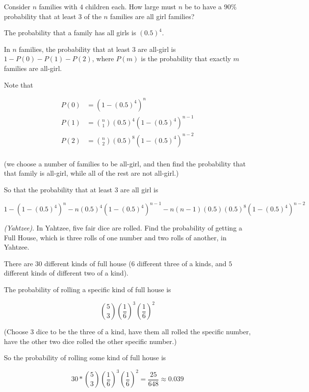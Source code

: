 \begin{problem}[Handout 5, \# 8]
  Consider \(n\) families with \(4\) children each. How large must \(n\) be
  to have a \(90\%\) probability that at least \(3\) of the \(n\) families
  are all girl families?
\end{problem}
\begin{solution}
The probability that a family has all girls is $(0.5)^4$.

In $n$ families, the probability that at least $3$ are all-girl is $1-P(0)-P(1)-P(2)$, where $P(m)$ is the probability that exactly $m$ families are all-girl. 

Note that

\begin{align*}
P(0) &= (1-(0.5)^4)^n \\
P(1) &= \binom{n}{1}(0.5)^4(1-(0.5)^4)^{n-1} \\
P(2) &= \binom{n}{2}(0.5)^8(1-(0.5)^4)^{n-2} \\
\end{align*}

(we choose a number of families to be all-girl, and then find the probability that that family is all-girl, while all of the rest are not all-girl.)

So that the probability that at least $3$ are all girl is

\[
1-(1-(0.5)^4)^n - n(0.5)^4(1-(0.5)^4)^{n-1} - n(n-1)(0.5)(0.5)^8(1-(0.5)^4)^{n-2}
\]


\end{solution}
\newpage

\begin{problem}[Handout 5, \# 10]
  \emph{(Yahtzee).} In Yahtzee, five fair dice are rolled. Find the
  probability of getting a Full House, which is three rolls of one number
  and two rolls of another, in Yahtzee.
\end{problem}
\begin{solution}
There are $30$ different kinds of full house ($6$ different three of a kinds, and $5$ different kinds of different two of a kind).

The probability of rolling a specific kind of full house is 

\[
\binom{5}{3} \left( \frac{1}{6}\right)^3 \left(\frac{1}{6} \right)^2
\]

(Choose 3 dice to be the three of a kind, have them all rolled the specific number, have the other two dice rolled the other specific number.)

So the probability of rolling some kind of full house is

\[
30* \binom{5}{3} \left( \frac{1}{6}\right)^3 \left(\frac{1}{6} \right)^2 = \frac{25}{648} \approx 0.039
\]

\end{solution}
\newpage


